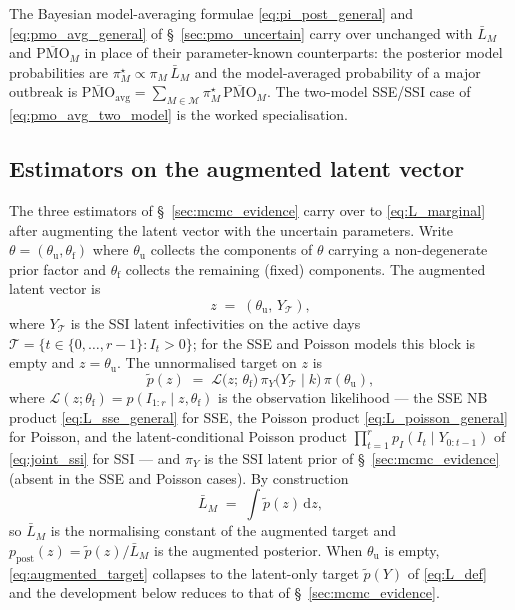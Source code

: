 \documentclass{article}
\theoremstyle{definition}
\begin{document}
The Bayesian model-averaging formulae \eqref{eq:pi_post_general} and
\eqref{eq:pmo_avg_general} of \S~\ref{sec:pmo_uncertain} carry over
unchanged with \(\bar L_M\) and \(\overline{\mathrm{PMO}}_M\) in place
of their parameter-known counterparts: the posterior model
probabilities are \(\pi_M^\star \propto \pi_M\, \bar L_M\) and the
model-averaged probability of a major outbreak is
\(\overline{\mathrm{PMO}}_\mathrm{avg}
  = \sum_{M \in \mathcal{M}} \pi_M^\star\,
    \overline{\mathrm{PMO}}_M\).  The two-model SSE/SSI case of
\eqref{eq:pmo_avg_two_model} is the worked specialisation.

\subsection{Estimators on the augmented latent vector}
\label{sec:param_uncertain_estimators}

The three estimators of \S~\ref{sec:mcmc_evidence} carry over to
\eqref{eq:L_marginal} after augmenting the latent vector with the
uncertain parameters.  Write
\(\theta = (\theta_{\mathrm u}, \theta_{\mathrm f})\) where
\(\theta_{\mathrm u}\) collects the components of \(\theta\) carrying a
non-degenerate prior factor and \(\theta_{\mathrm f}\) collects the
remaining (fixed) components.  The augmented latent vector is
\begin{equation*}
  z \;=\; (\theta_{\mathrm u},\, Y_{\mathcal T}),
\end{equation*}
where \(Y_{\mathcal T}\) is the SSI latent infectivities on the active
days \(\mathcal T = \{t \in \{0,\dots,r-1\} : I_t > 0\}\); for the SSE
and Poisson models this block is empty and \(z = \theta_{\mathrm u}\).
The unnormalised target on \(z\) is
\begin{equation}\label{eq:augmented_target}
  \tilde p(z)
  \;=\;
  \mathcal L\!\bigl(z;\, \theta_{\mathrm f}\bigr)\,
  \pi_Y\!\bigl(Y_{\mathcal T} \mid k\bigr)\,
  \pi(\theta_{\mathrm u}),
\end{equation}
where
\(\mathcal L(z; \theta_{\mathrm f}) =
   p(I_{1:r} \mid z, \theta_{\mathrm f})\) is the observation
likelihood — the SSE NB product \eqref{eq:L_sse_general} for SSE, the
Poisson product \eqref{eq:L_poisson_general} for Poisson, and the
latent-conditional Poisson product
\(\prod_{t=1}^r p_I(I_t \mid Y_{0:t-1})\) of \eqref{eq:joint_ssi} for
SSI — and \(\pi_Y\) is the SSI latent prior of \S~\ref{sec:mcmc_evidence}
(absent in the SSE and Poisson cases).  By construction
\begin{equation}\label{eq:Lbar_normalising}
  \bar L_M \;=\; \int \tilde p(z)\, \mathrm{d}z,
\end{equation}
so \(\bar L_M\) is the normalising constant of the augmented target and
\(p_{\mathrm{post}}(z) = \tilde p(z) / \bar L_M\) is the augmented
posterior.  When \(\theta_{\mathrm u}\) is empty, \eqref{eq:augmented_target}
collapses to the latent-only target \(\tilde p(Y)\) of
\eqref{eq:L_def} and the development below reduces to that of
\S~\ref{sec:mcmc_evidence}.
\end{document}
